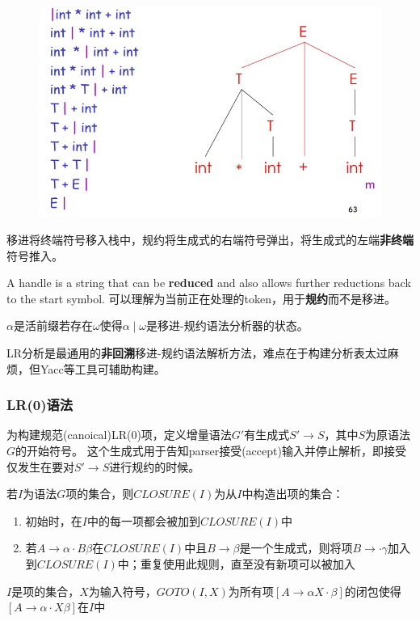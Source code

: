 \begin{figure}[H]
\centering
\includegraphics[width=0.8\linewidth]{fig/shift-reduce.jpg}
\end{figure}
移进将终端符号移入栈中，规约将生成式的右端符号弹出，将生成式的左端\textbf{非终端}符号推入。

\begin{definition}[句柄(handle)]
A handle is a string that can be \textbf{reduced} and also allows further reductions back to the start symbol.
可以理解为当前正在处理的token，用于\textbf{规约}而不是移进。
\end{definition}

\begin{definition}
$\alpha$是活前缀若存在$\omega$使得$\alpha\mid\omega$是移进-规约语法分析器的状态。
\end{definition}

LR分析是最通用的\textbf{非回溯}移进-规约语法解析方法，难点在于构建分析表太过麻烦，但Yacc等工具可辅助构建。

\subsubsection{LR(0)语法}
为构建规范(canoical)LR(0)项，定义增量语法$G'$有生成式$S'\to S$，其中$S$为原语法$G$的开始符号。
这个生成式用于告知parser接受(accept)输入并停止解析，即接受仅发生在要对$S'\to S$进行规约的时候。

\begin{definition}[CLOSURE]
若$I$为语法$G$项的集合，则$CLOSURE(I)$为从$I$中构造出项的集合：
\begin{enumerate}
	\item 初始时，在$I$中的每一项都会被加到$CLOSURE(I)$中
	\item 若$A\to\alpha\cdot B\beta$在$CLOSURE(I)$中且$B\to\beta$是一个生成式，则将项$B\to\cdot\gamma$加入到$CLOSURE(I)$中；重复使用此规则，直至没有新项可以被加入
\end{enumerate}
\end{definition}
\begin{definition}[GOTO]
$I$是项的集合，$X$为输入符号，$GOTO(I,X)$为所有项$[A\to\alpha X\cdot\beta]$的闭包使得$[A\to\alpha\cdot X\beta]$在$I$中
\end{definition}

